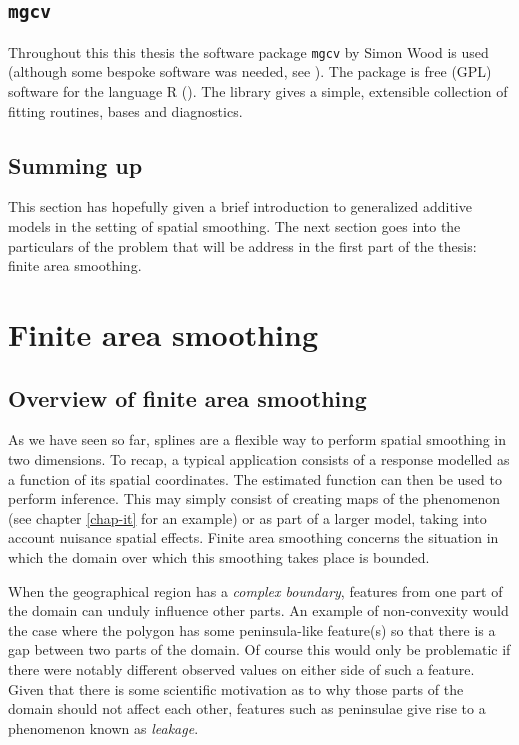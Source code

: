 \subsection{\texttt{mgcv}}
\label{intro-mgcv}

Throughout this this thesis the software package \texttt{mgcv} by Simon Wood is used (although some bespoke software was needed, see ). The package is free (GPL) software for the language \textsf{R} (\cite{Rsoftware}). The library gives a simple, extensible collection of fitting routines, bases and diagnostics.


\subsection{Summing up}

This section has hopefully given a brief introduction to generalized additive models in the setting of spatial smoothing. The next section goes into the particulars of the problem that will be address in the first part of the thesis: finite area smoothing.


\section{Finite area smoothing}
\label{intro-FAS}

\subsection{Overview of finite area smoothing}

As we have seen so far, splines are a flexible way to perform spatial smoothing in two dimensions. To recap, a typical application consists of a response modelled as a function of its spatial coordinates. The estimated function can then be used to perform inference. This may simply consist of creating maps of the phenomenon (see chapter \ref{chap-it} for an example) or as part of a larger model, taking into account nuisance spatial effects. Finite area smoothing concerns the situation in which the domain over which this smoothing takes place is bounded.

When the geographical region has a \emph{complex boundary}, features from one part of the domain can unduly influence other parts. An example of non-convexity would the case where the polygon has some peninsula-like feature(s) so that there is a gap between two parts of the domain. Of course this would only be problematic if there were notably different observed values on either side of such a feature. Given that there is some scientific motivation as to why those parts of the domain should not affect each other, features such as peninsulae give rise to a phenomenon known as \emph{leakage}.

